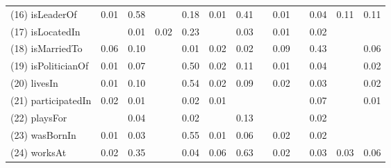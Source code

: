 \begin{table}[t]
\begin{center}
\begin{tabular}{|l||*{12}{c}|}
            (16) isLeaderOf  & 0.01  & 0.58  &    & 0.18  & 0.01  & 0.41  &    & 0.01  &    & 0.04  & 0.11  & 0.11 \\
            (17) isLocatedIn  &    & 0.01  & 0.02  & 0.23  &    & 0.03  &    & 0.01  &    & 0.02  &    &   \\
            (18) isMarriedTo  & 0.06  & 0.10  &    & 0.01  & 0.02  & 0.02  &    & 0.09  &    & 0.43  &    & 0.06 \\
            (19) isPoliticianOf  & 0.01  & 0.07  &    & 0.50  & 0.02  & 0.11  &    & 0.01  &    & 0.04  &    & 0.02 \\
            (20) livesIn  & 0.01  & 0.10  &    & 0.54  & 0.02  & 0.09  &    & 0.02  &    & 0.03  &    & 0.02 \\
            (21) participatedIn  & 0.02  & 0.01  &    & 0.02  & 0.01  &    &    &    &    & 0.07  &    & 0.01 \\
            (22) playsFor  &    & 0.04  &    & 0.02  &    & 0.13  &    &    &    & 0.02  &    &   \\
            (23) wasBornIn  & 0.01  & 0.03  &    & 0.55  & 0.01  & 0.06  &    & 0.02  &    & 0.02  &    &   \\
            (24) worksAt  & 0.02  & 0.35  &    & 0.04  & 0.06  & 0.63  &    & 0.02  &    & 0.03  & 0.03  & 0.06 \\
            \hline
            

\end{tabular}
\end{center}
\end{table}
